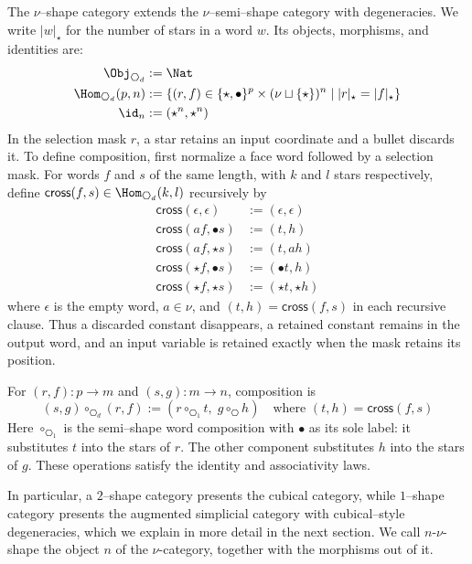 \documentclass[a4paper,UKenglish,cleveref,autoref]{lipics-v2021}
\newcommand{\kstar}{{\star}}
\begin{document}
\begin{definition}[$\hexagon_d$]
  The $\nu$--shape category extends the $\nu$--semi--shape category with degeneracies. We write $|w|_{\kstar}$ for the number of stars in a word $w$. Its objects, morphisms, and identities are:
  \begin{align*}
    \Obj_{\hexagon_d}      & := \Nat                                  \\
    \Hom_{\hexagon_d}(p,n) & := \{(r,f) \in \{\kstar,\bullet\}^p
    \times (\nu \sqcup \{\kstar\})^n \mid |r|_{\kstar}=|f|_{\kstar}\} \\
    \id_n                  & := (\kstar^n,\kstar^n)
  \end{align*}
  In the selection mask $r$, a star retains an input coordinate and a bullet discards it. To define composition, first normalize a face word followed by a selection mask. For words $f$ and $s$ of the same length, with $k$ and $l$ stars respectively, define $\mathsf{cross}(f,s)\in\Hom_{\hexagon_d}(k,l)$ recursively by
  \begin{align*}
    \mathsf{cross}(\epsilon,\epsilon)  & := (\epsilon,\epsilon) \\
    \mathsf{cross}(a f,\bullet s)      & := (t,h)               \\
    \mathsf{cross}(a f,\kstar s)       & := (t,a h)             \\
    \mathsf{cross}(\kstar f,\bullet s) & := (\bullet t,h)       \\
    \mathsf{cross}(\kstar f,\kstar s)  & := (\kstar t,\kstar h)
  \end{align*}
  where $\epsilon$ is the empty word, $a\in\nu$, and $(t,h)=\mathsf{cross}(f,s)$ in each recursive clause. Thus a discarded constant disappears, a retained constant remains in the output word, and an input variable is retained exactly when the mask retains its position.

  For $(r,f):p\to m$ and $(s,g):m\to n$, composition is
  \[
    (s,g)\circ_{\hexagon_d}(r,f)
    := (r\circ_{\hexagon_1}t,\;g\circ_{\hexagon}h)
    \quad\text{where }(t,h)=\mathsf{cross}(f,s)
  \]
  Here $\circ_{\hexagon_1}$ is the semi--shape word composition with $\bullet$ as its sole label: it substitutes $t$ into the stars of $r$. The other component substitutes $h$ into the stars of $g$. These operations satisfy the identity and associativity laws.
\end{definition}

In particular, a $2$--shape category presents the cubical category, while $1$--shape category presents the augmented simplicial category with cubical--style degeneracies, which we explain in more detail in the next section. We call $n$-$\nu$-shape the object $n$ of the $\nu$-category, together with the morphisms out of it.
\end{document}
